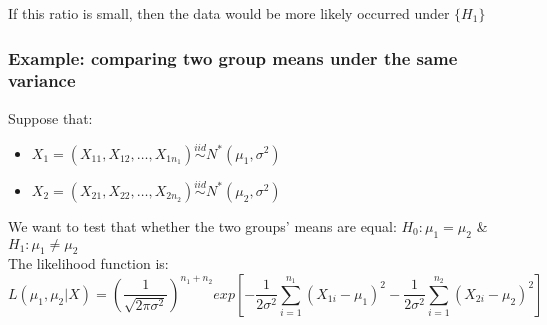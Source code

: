 \documentclass[12pt ]{article}
\begin{document}
If this ratio is small, then the data would be more likely occurred under $ \{H_{1} \}$

\subsubsection{Example: comparing two group means under the same variance}
Suppose that:
\begin{itemize}
\item $X_{1} = (X_{11}, X_{12}, \ldots, X_{1n_{1}}) \overset{iid}{\sim} N^{*}(\mu_{1}, \sigma^2)$
\item $X_{2} = (X_{21}, X_{22}, \ldots, X_{2n_{2}}) \overset{iid}{\sim} N^{*}(\mu_{2}, \sigma^2)$
\end{itemize}
We want to test that whether the two groups' means are equal: $H_{0}: \mu_{1} = \mu_{2}$ \& $H_{1}: \mu_{1} \neq \mu_{2}$ \\

The likelihood function is:
\begin{equation*}
L(\mu_{1}, \mu_{2} | X) = (\frac{1}{\sqrt{2 \pi \sigma^2}})^{n_{1}+n_{2}} exp[-\frac{1}{2\sigma^2} \sum_{i=1}^{n_{1}} (X_{1i} - \mu_{1})^2 -\frac{1}{2\sigma^2} \sum_{i=1}^{n_{2}} (X_{2i} - \mu_{2})^2]
\end{equation*} \\
\end{document}
